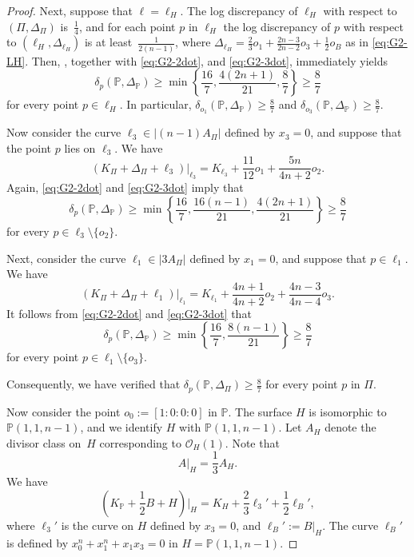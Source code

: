 \documentclass[12pt]{amsart}
\theoremstyle{definition}
\theoremstyle{remark}
\begin{document}
\begin{proof}
Next, suppose that $\ell=\ell_H$. The log discrepancy of $\ell_H$ with respect to $(\Pi,\Delta_\Pi)$ is~$\frac{1}{4}$, and for each point $p$ in $\ell_H$ the log 
discrepancy of $p$ with respect to $(\ell_H,\Delta_{\ell_H})$ is at least~$\frac{1}{2(n-1)}$, where $\Delta_{\ell_H}=\frac{2}{3}o_1
+\frac{2n-3}{2n-2}o_3
+\frac{1}{2}o_B$ as in \eqref{eq:G2-LH}.
Then, \cite[Corollary~4.8]{Fu23}, together with \eqref{eq:G2-2dot}, and \eqref{eq:G2-3dot}, immediately yields
\[
\delta_{p}\left(\mathbb{P},\Delta_\mathbb{P}\right)
\ge
\min\left\{
\frac{16}{7},
\frac{4(2n+1)}{21},
\frac{8}{7}
\right\}
\ge
\frac{8}{7}
\]
for every point $p\in\ell_H$. In particular,  $\delta_{o_1}\left(\mathbb{P},\Delta_\mathbb{P}\right)\geq \frac{8}{7}$ and $ \delta_{o_3}\left(\mathbb{P},\Delta_\mathbb{P}\right)\geq \frac{8}{7}$.


Now consider the curve $\ell_3\in |(n-1)A_\Pi|$ defined by $x_3=0$, and suppose that the  point $p$ lies on $\ell_3$. We have
\[
\left(K_\Pi+\Delta_\Pi+\ell_3\right)\big|_{\ell_3}
=
K_{\ell_3}
+\frac{11}{12}o_1
+\frac{5n}{4n+2}o_2.
\]
Again, \eqref{eq:G2-2dot} and \eqref{eq:G2-3dot} imply that
\[
\delta_{p}\left(\mathbb{P},\Delta_\mathbb{P}\right)
\ge
\min\left\{
\frac{16}{7},
\frac{16(n-1)}{21},
\frac{4(2n+1)}{21}
\right\}
\ge
\frac{8}{7}
\]
for every $p\in\ell_3\setminus\{o_2\}$. 


Next, consider the curve $\ell_1\in |3A_\Pi|$ defined by $x_1=0$, and suppose that $p\in \ell_1$. We have
\[
\left(K_\Pi+\Delta_\Pi+\ell_1\right)\big|_{\ell_1}
=
K_{\ell_1}
+\frac{4n+1}{4n+2}o_2
+\frac{4n-3}{4n-4}o_3.
\]
It follows from \eqref{eq:G2-2dot} and \eqref{eq:G2-3dot} that
\[
\delta_{p}\left(\mathbb{P},\Delta_\mathbb{P}\right)
\ge
\min\left\{
\frac{16}{7},
\frac{8(n-1)}{21}
\right\}
\ge
\frac{8}{7}
\]
for every point $p\in \ell_1\setminus\{o_3\}$. 

Consequently,  we have verified that
$\delta_{p}\left(\mathbb{P}, \Delta_\Pi\right)\geq\frac{8}{7}$ for every point $p$ in $\Pi$.



Now consider the point $o_0:=[1:0:0:0]$ in $\mathbb{P}$. The surface $H$ is isomorphic to $\mathbb{P}(1,1,n-1)$, and we identify $H$ with $\mathbb{P}(1,1,n-1)$. Let $A_H$ denote the divisor class on~$H$ corresponding to $\mathcal{O}_H(1)$. Note that
\[
A|_H=\frac{1}{3}A_H.
\]
We have
\[
\left(K_\mathbb{P}+\frac{1}{2}B+H\right)\Big|_{H}
=K_H+\frac{2}{3}\ell_3'+\frac{1}{2}\ell_B',
\]
where $\ell_3'$ is the curve on $H$ defined by $x_3=0$, and $\ell_B':=B|_H$. The curve $\ell_B'$ is defined by
$
x_0^n+x_1^n+x_1x_3=0
$
in $H=\mathbb{P}(1,1,n-1)$.


\end{proof}
\end{document}

